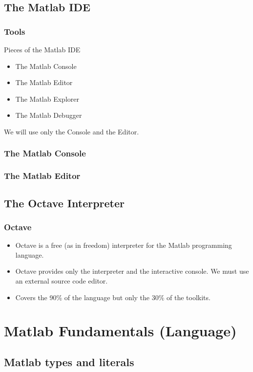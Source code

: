 \documentclass[12pt]{beamer}
\begin{document}
\subsection{The Matlab IDE}
\begin{frame}
  \frametitle{Tools}
Pieces of the Matlab IDE
\begin{itemize}
\item The Matlab Console
\item The Matlab Editor
\item The Matlab Explorer
\item The Matlab Debugger
\end{itemize}
We will use only the Console and the Editor.
\end{frame}

\begin{frame}
  \frametitle{The Matlab Console}


\end{frame}

\begin{frame}
  \frametitle{The Matlab Editor}

\end{frame}

\subsection{The Octave Interpreter}
\begin{frame}
  \frametitle{Octave}
  \begin{itemize}
  \item Octave is a free (as in freedom) interpreter for the Matlab
    programming language.
  \item Octave provides only the interpreter and the interactive
    console. We must use an external source code editor.
  \item Covers the 90\% of the language but only the 30\% of the
    toolkits.
  \end{itemize}

\end{frame}

\section{Matlab Fundamentals (Language)}
\subsection{Matlab types and literals}
\end{document}
